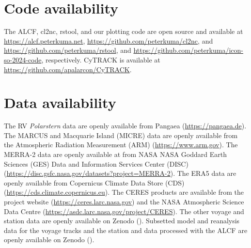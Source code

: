 \documentclass[12pt,a4paper]{article}
\begin{document}
\section*{Code availability}

The ALCF, cl2nc, rstool, and our plotting code are open source and available at
\url{https://alcf.peterkuma.net}, \url{https://github.com/peterkuma/cl2nc}, and
\url{https://github.com/peterkuma/rstool}, and
\url{https://github.com/peterkuma/icon-so-2024-code}, respectively. CyTRACK
is available at \url{https://github.com/apalarcon/CyTRACK}.

\section*{Data availability}

The RV \emph{Polarstern} data are openly available from Pangaea
(\url{https://pangaea.de}). The MARCUS and Macquarie Island (MICRE) data are
openly available from the Atmospheric Radiation Measurement (ARM)
(\url{https://www.arm.gov}). The MERRA-2 data are openly available at from NASA
NASA Goddard Earth Sciences (GES) Data and Information Services Center (DISC)
(\url{https://disc.gsfc.nasa.gov/datasets?project=MERRA-2}).  The ERA5 data are
openly available from Copernicus Climate Data Store (CDS)
(\url{https://cds.climate.copernicus.eu}). The CERES products are available
from the project website (\url{https://ceres.larc.nasa.gov}) and the NASA
Atmospheric Science Data Centre
(\url{https://asdc.larc.nasa.gov/project/CERES}).  The other voyage and station
data are openly available on Zenodo (). Subsetted model and reanalysis data for
the voyage tracks and the station and data processed with the ALCF are openly
available on Zenodo ().

\footnotesize
\setlength{\bibsep}{0.0pt}

\end{document}
